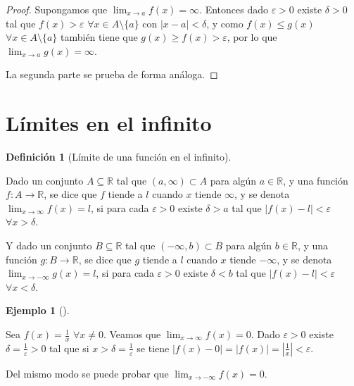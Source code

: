 \documentclass[
  a4paper,
]{scrreport}
\theoremstyle{definition}
\newtheorem{example}{Ejemplo}[chapter]
\theoremstyle{plain}
\theoremstyle{definition}
\newtheorem{definition}{Definición}[chapter]
\theoremstyle{definition}
\theoremstyle{plain}
\theoremstyle{plain}
\theoremstyle{remark}
\begin{document}
\begin{tcolorbox}[enhanced jigsaw, leftrule=.75mm, colbacktitle=quarto-callout-note-color!10!white, toprule=.15mm, opacityback=0, opacitybacktitle=0.6, toptitle=1mm, breakable, bottomtitle=1mm, colframe=quarto-callout-note-color-frame, rightrule=.15mm, titlerule=0mm, title=\textcolor{quarto-callout-note-color}{\faInfo}\hspace{0.5em}{Demostración}, arc=.35mm, left=2mm, bottomrule=.15mm, colback=white, coltitle=black]

\begin{proof}
Supongamos que \(\lim_{x\to a}f(x)=\infty\). Entonces dado
\(\varepsilon>0\) existe \(\delta>0\) tal que \(f(x)>\varepsilon\)
\(\forall x\in A\setminus\{a\}\) con \(|x-a|<\delta\), y como
\(f(x)\leq g(x)\) \(\forall x\in A\setminus\{a\}\) también tiene que
\(g(x)\geq f(x)>\varepsilon\), por lo que \(\lim_{x\to a}g(x)=\infty\).

La segunda parte se prueba de forma análoga.
\end{proof}

\end{tcolorbox}

\section{Límites en el infinito}\label{luxedmites-en-el-infinito-1}

\begin{definition}[Límite de una función en el
infinito]\protect\hypertarget{def-limite-en-infinito}{}\label{def-limite-en-infinito}

Dado un conjunto \(A\subseteq \mathbb{R}\) tal que
\((a,\infty)\subset A\) para algún \(a\in\mathbb{R}\), y una función
\(f:A\to \mathbb{R}\), se dice que \(f\) tiende a \(l\) cuando \(x\)
tiende \(\infty\), y se denota \(\lim_{x\to\infty}f(x)=l\), si para cada
\(\varepsilon>0\) existe \(\delta>a\) tal que \(|f(x)-l|<\varepsilon\)
\(\forall x>\delta\).

Y dado un conjunto \(B\subseteq \mathbb{R}\) tal que
\((-\infty,b)\subset B\) para algún \(b\in\mathbb{R}\), y una función
\(g:B\to \mathbb{R}\), se dice que \(g\) tiende a \(l\) cuando \(x\)
tiende \(-\infty\), y se denota \(\lim_{x\to-\infty}g(x)=l\), si para
cada \(\varepsilon>0\) existe \(\delta<b\) tal que
\(|f(x)-l|<\varepsilon\) \(\forall x<\delta\).

\end{definition}

\begin{example}[]\protect\hypertarget{exm-limite-en-infinito}{}\label{exm-limite-en-infinito}

Sea \(f(x)=\frac{1}{x}\) \(\forall x\neq 0\). Veamos que
\(\lim_{x\to\infty}f(x)=0\). Dado \(\varepsilon>0\) existe
\(\delta=\frac{1}{\varepsilon}>0\) tal que si
\(x>\delta=\frac{1}{\varepsilon}\) se tiene
\(|f(x)-0|=|f(x)| = \left|\frac{1}{x}\right|<\varepsilon\).

Del mismo modo se puede probar que \(\lim_{x\to -\infty}f(x)=0\).

\end{example}
\end{document}
